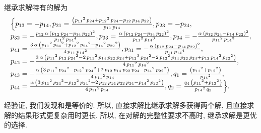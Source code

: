 继承求解特有的解为 
\begin{equation}
\renewcommand{\arraystretch}{1.2}
\begin{array}{l}
\dbrace{
{{p}_{13}}=-{{p}_{14}},
{{p}_{21}}=\frac{\left( {{{p}_{11}}}^{2}\,{{p}_{24}}+{{{p}_{12}}}^{2}\,{{p}_{24}}-{{p}_{12}}\,{{p}_{14}}\,{{p}_{22}}\right) }{{{p}_{11}}\,{{p}_{14}}},
{{p}_{23}}=-{{p}_{24}},\\
{{p}_{32}}=-\frac{{{p}_{12}}\,\alpha\,\left( {{p}_{12}}\,{{p}_{24}}-{{p}_{14}}\,{{p}_{22}}\right) ^{2}}{{{{p}_{11}}}^{2}\,{{{p}_{14}}}^{4}},
{{p}_{33}}=\frac{\alpha\,\left( {{p}_{12}}\,{{p}_{24}}-{{p}_{14}}\,{{p}_{22}}\right) ^{2}}{{{{p}_{11}}}^{2}\,{{{p}_{14}}}^{3}},
{{p}_{34}}=-\frac{\alpha\,\left( {{p}_{12}}\,{{p}_{24}}-{{p}_{14}}\,{{p}_{22}}\right) ^{2}}{{{{p}_{11}}}^{2}\,{{{p}_{14}}}^{3}},\\
{{p}_{41}}=\frac{3\,\alpha\,\left( {{{p}_{11}}}^{2}\,{{{p}_{24}}}^{2}+{{{p}_{12}}}^{2}\,{{{p}_{24}}}^{2}-{{{p}_{14}}}^{2}\,{{{p}_{22}}}^{2}\right) }{4\,{{p}_{11}}\,{{{p}_{14}}}^{2}},
{{p}_{31}}=-\frac{\alpha\,\left( {{p}_{12}}\,{{p}_{24}}-{{p}_{14}}\,{{p}_{22}}\right) ^{2}}{{{p}_{11}}\,{{{p}_{14}}}^{4}},\\
{{p}_{42}}=-\frac{3\,\alpha\,\left( {{{p}_{11}}}^{2}\,{{p}_{12}}\,{{{p}_{24}}}^{2}-2\,{{{p}_{11}}}^{2}\,{{p}_{14}}\,{{p}_{22}}\,{{p}_{24}}+{{{p}_{12}}}^{3}\,{{{p}_{24}}}^{2}-2\,{{{p}_{12}}}^{2}\,{{p}_{14}}\,{{p}_{22}}\,{{p}_{24}}+{{p}_{12}}\,{{{p}_{14}}}^{2}\,{{{p}_{22}}}^{2}\right) }{4\,{{{p}_{11}}}^{2}\,{{{p}_{14}}}^{2}},\\ 
{{p}_{43}}=-\frac{\alpha\,\left( 3\,{{{p}_{11}}}^{2}\,{{{p}_{24}}}^{2}-{{{p}_{12}}}^{2}\,{{{p}_{24}}}^{2}+2\,{{p}_{12}}\,{{p}_{14}}\,{{p}_{22}}\,{{p}_{24}}-{{{p}_{14}}}^{2}\,{{{p}_{22}}}^{2}\right) }{4\,{{{p}_{11}}}^{2}\,{{p}_{14}}},
{{q}_{1}}=\frac{\left( {{{p}_{11}}}^{2}+{{{p}_{12}}}^{2}\right) }{{{{p}_{14}}}^{2}},\\ 
{{p}_{44}}=\frac{\alpha\,\left( 3\,{{{p}_{11}}}^{2}\,{{{p}_{24}}}^{2}-{{{p}_{12}}}^{2}\,{{{p}_{24}}}^{2}+2\,{{p}_{12}}\,{{p}_{14}}\,{{p}_{22}}\,{{p}_{24}}-{{{p}_{14}}}^{2}\,{{{p}_{22}}}^{2}\right) }{4\,{{{p}_{11}}}^{2}\,{{p}_{14}}},
{{q}_{2}}=\frac{{{q}_{4}}\,\left( {{{p}_{11}}}^{2}+{{{p}_{12}}}^{2}\right) }{{{{p}_{14}}}^{2}\,{{q}_{3}}}
}.
\end{array}\label{2S1L-plot}
\end{equation}

经验证, 我们发现和是等价的. 所以, 直接求解比继承求解多获得两个解, 且直接求解的结果形式更复杂\D 用时更长. 所以, 在对解的完整性要求不高时, 继承求解是更优的选择.

